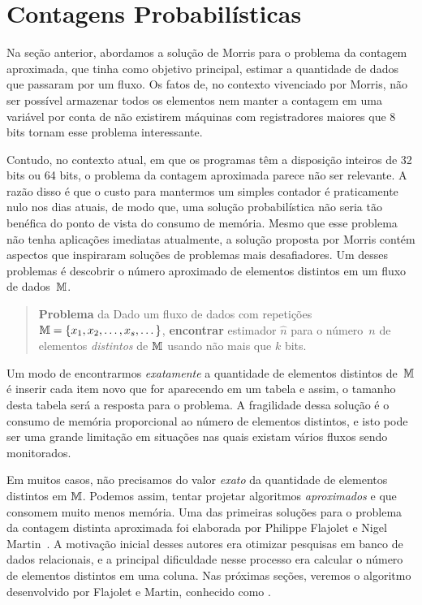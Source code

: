 \chapter{Contagens Probabilísticas}
\label{lab:flajolet-martin}

Na seção anterior, abordamos a solução de Morris para o problema da contagem aproximada, que tinha como objetivo 
principal, estimar a quantidade de dados que passaram por um fluxo. Os fatos de, no contexto vivenciado por Morris, não 
ser possível armazenar todos os elementos nem manter a contagem em uma variável por conta de não existirem máquinas com 
registradores maiores que 8 bits tornam esse problema interessante.

Contudo, no contexto atual, em que os programas têm a disposição inteiros de 32 bits ou 64 bits, o problema da contagem
aproximada parece não ser relevante. A razão disso é que o custo para mantermos um simples contador é praticamente nulo 
nos dias atuais, de modo que, uma solução probabilística não seria tão benéfica do ponto de vista do consumo de memória.
Mesmo que esse problema não tenha aplicações imediatas atualmente, a solução proposta por Morris contém aspectos que 
inspiraram soluções de problemas mais desafiadores. Um desses problemas é descobrir o número aproximado de elementos 
distintos em um fluxo de dados~$\mathbb{M}$. 

\begin{quote}
  \textbf{Problema} da  Dado um fluxo de dados com repetições
  $\mathbb{M} = \{ x_1, x_2, \dots, x_s, \dots \}$, \textbf{encontrar} estimador $\hat{n}$ para o número~$n$ de elementos 
  \textit{distintos} de $\mathbb{M}$ usando não mais que $k$ bits.
\end{quote}

Um modo de encontrarmos \textit{exatamente} a quantidade de elementos distintos de~$\mathbb{M}$ é inserir cada item novo que 
for aparecendo em um tabela e assim, o tamanho desta tabela será a resposta para o problema. A fragilidade dessa solução 
é o consumo de memória proporcional ao número de elementos distintos, e isto pode ser uma grande limitação em situações 
nas quais existam vários fluxos sendo monitorados. 

Em muitos casos, não precisamos do valor \textit{exato} da quantidade de elementos distintos em $\mathbb{M}$. Podemos assim, 
tentar projetar algoritmos \textit{aproximados} e que consomem muito menos memória. Uma das primeiras soluções para o 
problema da contagem distinta aproximada foi elaborada por Philippe Flajolet e Nigel Martin~\citep{flajolet:martin:85}. 
A motivação inicial desses autores era otimizar pesquisas em banco de dados relacionais, e a principal dificuldade nesse 
processo era calcular o número de elementos distintos em uma coluna. Nas próximas seções, veremos o algoritmo 
desenvolvido por Flajolet e Martin, conhecido como .

